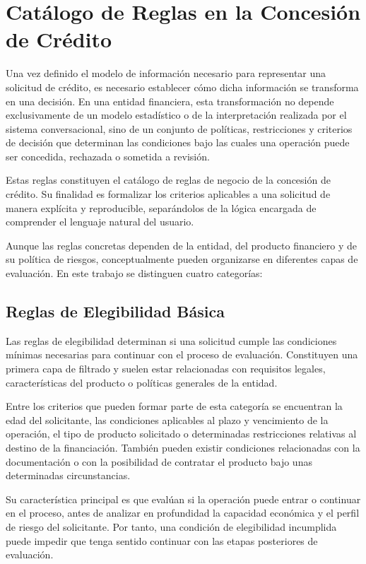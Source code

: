 \documentclass[12pt,a4paper]{report}
\begin{document}
\section{Catálogo de Reglas en la Concesión de Crédito}

Una vez definido el modelo de información necesario para representar una solicitud de crédito, es necesario establecer cómo dicha información se transforma en una decisión. En una entidad financiera, esta transformación no depende exclusivamente de un modelo estadístico o de la interpretación realizada por el sistema conversacional, sino de un conjunto de políticas, restricciones y criterios de decisión que determinan las condiciones bajo las cuales una operación puede ser concedida, rechazada o sometida a revisión.

Estas reglas constituyen el catálogo de reglas de negocio de la concesión de crédito. Su finalidad es formalizar los criterios aplicables a una solicitud de manera explícita y reproducible, separándolos de la lógica encargada de comprender el lenguaje natural del usuario.

Aunque las reglas concretas dependen de la entidad, del producto financiero y de su política de riesgos, conceptualmente pueden organizarse en diferentes capas de evaluación. En este trabajo se distinguen cuatro categorías:

\subsection{Reglas de Elegibilidad Básica}

Las reglas de elegibilidad determinan si una solicitud cumple las condiciones mínimas necesarias para continuar con el proceso de evaluación. Constituyen una primera capa de filtrado y suelen estar relacionadas con requisitos legales, características del producto o políticas generales de la entidad.

Entre los criterios que pueden formar parte de esta categoría se encuentran la edad del solicitante, las condiciones aplicables al plazo y vencimiento de la operación, el tipo de producto solicitado o determinadas restricciones relativas al destino de la financiación. También pueden existir condiciones relacionadas con la documentación o con la posibilidad de contratar el producto bajo unas determinadas circunstancias.

Su característica principal es que evalúan si la operación puede entrar o continuar en el proceso, antes de analizar en profundidad la capacidad económica y el perfil de riesgo del solicitante. Por tanto, una condición de elegibilidad incumplida puede impedir que tenga sentido continuar con las etapas posteriores de evaluación.
\end{document}
